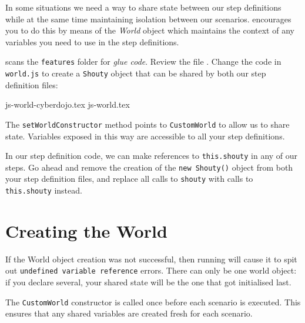 In some situations we need a way to share state between our step definitions while at the same time maintaining isolation between our scenarios. \CUKE{} encourages you to do this by means of the \emph{World} object which maintains the context of any variables you need to use in the step definitions. 

\CUKE{} scans the \texttt{features} folder for \emph{glue code}.  Review the file . Change the code in \texttt{world.js} to create a \texttt{Shouty} object that can be shared by both our step definition files:

\CYBERDOJO
{{js-world-cyberdojo.tex}}
{{js-world.tex}}

The \texttt{setWorldConstructor} method points to \texttt{CustomWorld} to allow us to share state. Variables exposed in this way are accessible to all your step definitions.

In our step definition code, we can make references to \texttt{this.shouty} in any of our steps. Go ahead and remove the creation of the \texttt{new Shouty()} object from both your step definition files, and replace all calls to \texttt{shouty} with calls to \texttt{this.shouty} instead.

\section*{Creating the World}

If the World object creation was not successful, then running \CUKE{} will cause it to spit out \texttt{undefined variable reference} errors. There can only be one world object: if you declare several, your shared state will be the one that got initialised last.

The \texttt{CustomWorld} constructor is called once before each scenario is executed. This ensures that any shared variables are created fresh for each scenario.

